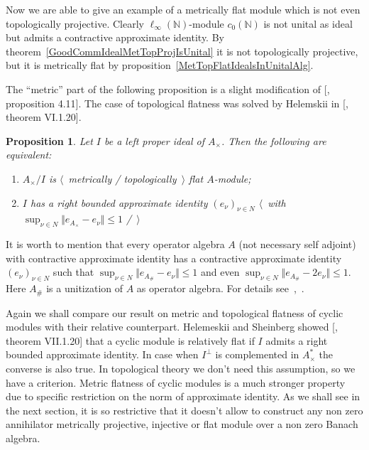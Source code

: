 \documentclass[12pt]{article}
\newtheorem{proposition}[theorem]{Proposition}
\begin{document}
Now we are able to give an example of a metrically flat module which is not even
topologically projective. Clearly $\ell_\infty(\mathbb{N})$-module
$c_0(\mathbb{N})$ is not unital as ideal but admits a contractive approximate
identity. By theorem~\ref{GoodCommIdealMetTopProjIsUnital} it is not
topologically projective, but it is metrically flat by
proposition~\ref{MetTopFlatIdealsInUnitalAlg}.

The ``metric'' part of the following proposition is a slight modification of
    [\cite{WhiteInjmoduAlg}, proposition 4.11]. The case of topological flatness
was solved by Helemskii in [\cite{HelHomolBanTopAlg}, theorem VI.1.20].

\begin{proposition}\label{MetTopFlatCycModCharac} Let $I$ be a left proper ideal
    of $A_\times $. Then the following are equivalent:
    \begin{enumerate}[label = (\roman*)]
        \item $A_\times /I$ is $\langle$~metrically / topologically~$\rangle$
              flat $A$-module;

        \item $I$ has a right bounded approximate identity ${(e_\nu)}_{\nu\in
                          N}$ $\langle$~with $\sup_{\nu\in N}\Vert e_{A_\times
                      }-e_\nu\Vert\leq 1$ /~$\rangle$
    \end{enumerate}
\end{proposition}

It is worth to mention that every operator algebra $A$ (not necessary self
adjoint) with contractive approximate identity has a contractive approximate
identity ${(e_\nu)}_{\nu\in N}$ such that $\sup_{\nu\in N}\Vert
    e_{A_\#}-e_\nu\Vert\leq 1$ and even $\sup_{\nu\in N}\Vert
    e_{A_\#}-2e_\nu\Vert\leq 1$. Here $A_\#$ is a unitization of $A$ as operator
algebra. For details
see~\cite{PosAndApproxIdinBanAlg},~\cite{BleContrAppIdInOpAlg}.

Again we shall compare our result on metric and topological flatness of cyclic
modules with their relative counterpart. Helemeskii and Sheinberg
showed [\cite{HelHomolBanTopAlg}, theorem VII.1.20] that a cyclic module is
relatively flat if $I$ admits a right bounded approximate identity. In case when
$I^\perp$ is complemented in $A_\times^*$ the converse is also true. In
topological theory we don't need this assumption, so we have a criterion. Metric
flatness of cyclic modules is a much stronger property due to specific
restriction on the norm of approximate identity. As we shall see in the next
section, it is so restrictive that it doesn't allow to construct any non zero
annihilator metrically projective, injective or flat module over a non zero
Banach algebra.
\end{document}

